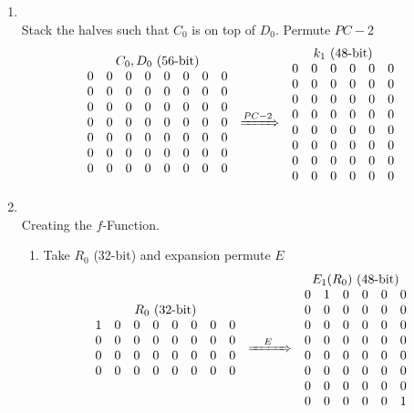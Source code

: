 \documentclass[12pt]{article}
\begin{document}
\begin{enumerate}
\begin{enumerate}
\begin{enumerate}
			\item
				\quad\\
				Stack the halves such that $C_0$ is on top of $D_0$. Permute $PC-2$
				\[
				\stackrel{\mbox{$C_0, D_0$ (56-bit)}}{
					\begin{matrix}
						0&0&0&0&0&0&0&0\\
						0&0&0&0&0&0&0&0\\
						0&0&0&0&0&0&0&0\\
						0&0&0&0&0&0&0&0\\
						0&0&0&0&0&0&0&0\\
						0&0&0&0&0&0&0&0\\
						0&0&0&0&0&0&0&0
					\end{matrix}}\quad
				\xRightarrow{PC-2}\quad
				\stackrel{\mbox{$k_1$ (48-bit)}}{
					\begin{matrix}
						0&0&0&0&0&0\\ 
						0&0&0&0&0&0\\
						0&0&0&0&0&0\\
						0&0&0&0&0&0\\
						0&0&0&0&0&0\\
						0&0&0&0&0&0\\
						0&0&0&0&0&0\\
						0&0&0&0&0&0
					\end{matrix}}
				\]
				
			\item
				\quad\\
				Creating the $f$-Function.\\
				\begin{enumerate}				
				\item
					Take $R_0$ (32-bit) and expansion permute $E$
					\[
					\stackrel{\mbox{$R_0$ (32-bit)}}{
					\begin{matrix}
						1&0&0&0&0&0&0&0\\
						0&0&0&0&0&0&0&0\\
						0&0&0&0&0&0&0&0\\
						0&0&0&0&0&0&0&0
					\end{matrix}}\quad
					\xRightarrow{\quad E\quad}\quad
					\stackrel{\mbox{$E_1(R_0)$ (48-bit)}}{
					\begin{matrix}
						0&1&0&0&0&0\\ 
						0&0&0&0&0&0\\
						0&0&0&0&0&0\\
						0&0&0&0&0&0\\
						0&0&0&0&0&0\\
						0&0&0&0&0&0\\
						0&0&0&0&0&0\\
						0&0&0&0&0&1
					\end{matrix}}
					\]
					

\end{enumerate}
\end{enumerate}
\end{enumerate}
\end{enumerate}
\end{document}
